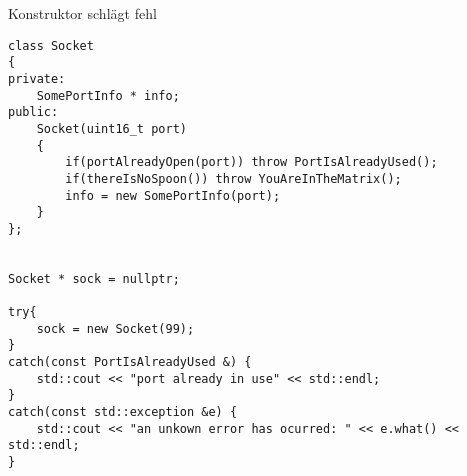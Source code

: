 \begin{frame}[fragile]{Konstruktor schlägt fehl}
	\begin{lstlisting}[basicstyle=\tiny]
class Socket
{
private:
    SomePortInfo * info;
public:
    Socket(uint16_t port)
    {
        if(portAlreadyOpen(port)) throw PortIsAlreadyUsed();
        if(thereIsNoSpoon()) throw YouAreInTheMatrix();
        info = new SomePortInfo(port);
    }
};


Socket * sock = nullptr;

try{
    sock = new Socket(99);
}
catch(const PortIsAlreadyUsed &) {
    std::cout << "port already in use" << std::endl;
}
catch(const std::exception &e) {
    std::cout << "an unkown error has ocurred: " << e.what() << std::endl;
}
    \end{lstlisting}

\end{frame}
